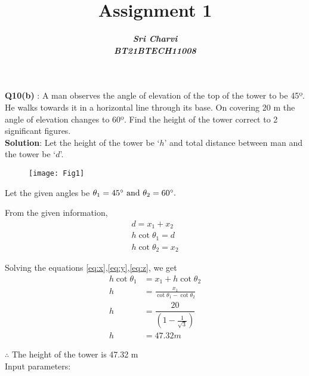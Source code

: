 \documentclass[journal,12pt,twocolumn]{IEEEtran}
\title{ Assignment 1}
\author{\textbf{\textit{Sri Charvi}}\\
\textbf{\textit{BT21BTECH11008}}}
\begin{document}
\maketitle
\textbf{Q10(b) }: A man observes the angle of elevation of the top of the tower to be 45º.
 He walks towards it in a horizontal line through its base. On covering 20 m the angle of 
elevation changes to 60º. Find the height of the tower correct to 2 significant figures.\\

\medskip
\textbf{Solution}: Let the height of the tower be `$h$' and total distance between man and the tower be `$d$'.\\

\begin{figure}[h]
    \centering
    \texttt{[image: Fig1]}
    \caption{}
    \label{Fig1}
\end{figure}

 Let the given angles
be $\theta_1=45\degree \text{ and } \theta_2=60\degree.$

From the given information,
\begin{align}
\label{eq:x}
d=x_1+x_2\\
\label{eq:y}
h\cot\theta_1=d\\
\label{eq:z}
h\cot\theta_2=x_2 
\end{align}

Solving the equations \eqref{eq:x},\eqref{eq:y},\eqref{eq:z}, we get
\begin{align*}
 h\cot\theta_1&=x_1+h\cot\theta_2\\
 h&=\frac{x_1}{\cot\theta_1-\cot\theta_2}\\
 h&=\dfrac{20}{\left(1-\frac{1}{\sqrt{3}}\right)}\\
 h &= 47.32m
\end{align*}

$\therefore $ The height of the tower is 47.32 m\\


Input parameters:

\begin{table}[!h]
	   
\end{table}
\end{document}
